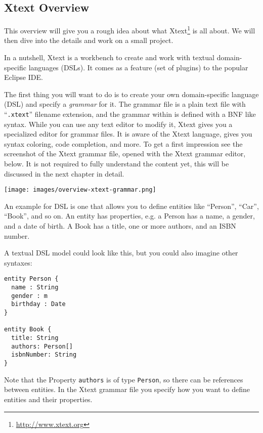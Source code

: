 \subsection{Xtext Overview}

This overview will give you a rough idea about what
Xtext\footnote{\url{http://www.xtext.org}} is all about. We will then dive into
the details and work on a small project.

In a nutshell, Xtext is a workbench to create and work with textual
domain-specific languages (DSLs). It comes as a feature (set of plugins) to the
popular Eclipse IDE.

The first thing you will want to do is to create your own domain-specific
language (DSL) and specify a \emph{grammar} for it. The grammar file is a plain
text file with ``\texttt{.xtext}'' filename extension, and the grammar within is
defined with a BNF like syntax. While you can use any text editor to modify it,
Xtext gives you a specialized editor for grammar files. It is aware of the Xtext
language, gives you syntax coloring, code completion, and more. To get a first
impression see the screenshot of the Xtext grammar file, opened with the Xtext
grammar editor, below. It is not required to fully understand the content yet,
this will be discussed in the next chapter in detail.

\texttt{[image: images/overview-xtext-grammar.png]}

An example for DSL is one that allows you to define entities like ``Person'',
``Car'', ``Book'', and so on.
An entity has properties, e.g. a
Person has a name, a gender, and a date of birth. A Book has a title, one or
more authors, and an ISBN number.

A textual DSL model could look like this, but you could also imagine other
syntaxes:
\begin{lstlisting}
entity Person {
  name : String
  gender : m
  birthday : Date
}

entity Book {
  title: String
  authors: Person[]
  isbnNumber: String
}
\end{lstlisting}

Note that the Property \texttt{authors} is of type \texttt{Person}, so there can
be references between entities. In the Xtext grammar file you specify how you
want to define entities and their properties.

